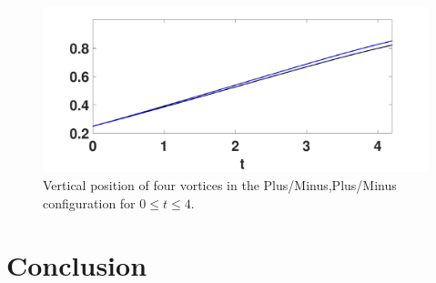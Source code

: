 \documentclass[a4paper,11pt]{article}
\begin{document}
\begin{figure}[!h]
\centering
\includegraphics[width=.75\textwidth]{ztrack_mu_pt2_F_pt2_tf_4pt2_pmpm}
\caption{Vertical position of four vortices in the Plus/Minus,Plus/Minus configuration for $0\leq t \leq 4$.}
\end{figure}

\section{Conclusion}



\end{document}
